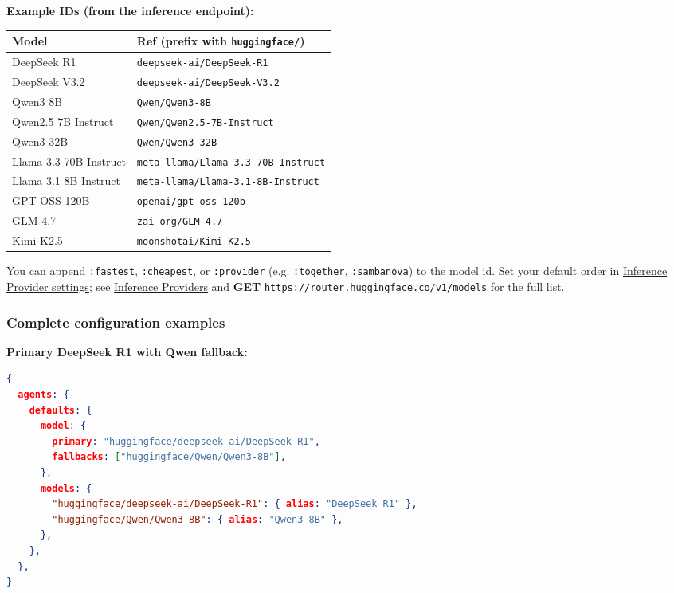 \textbf{Example IDs (from the inference endpoint):}


\begin{table}[h]
\centering
\small
\begin{tabular}{|l|l|}
\hline
Model & Ref (prefix with \texttt{huggingface/}) \\
\hline
DeepSeek R1 & \texttt{deepseek-ai/DeepSeek-R1} \\
\hline
DeepSeek V3.2 & \texttt{deepseek-ai/DeepSeek-V3.2} \\
\hline
Qwen3 8B & \texttt{Qwen/Qwen3-8B} \\
\hline
Qwen2.5 7B Instruct & \texttt{Qwen/Qwen2.5-7B-Instruct} \\
\hline
Qwen3 32B & \texttt{Qwen/Qwen3-32B} \\
\hline
Llama 3.3 70B Instruct & \texttt{meta-llama/Llama-3.3-70B-Instruct} \\
\hline
Llama 3.1 8B Instruct & \texttt{meta-llama/Llama-3.1-8B-Instruct} \\
\hline
GPT-OSS 120B & \texttt{openai/gpt-oss-120b} \\
\hline
GLM 4.7 & \texttt{zai-org/GLM-4.7} \\
\hline
Kimi K2.5 & \texttt{moonshotai/Kimi-K2.5} \\
\hline
\end{tabular}
\end{table}



You can append \texttt{:fastest}, \texttt{:cheapest}, or \texttt{:provider} (e.g. \texttt{:together}, \texttt{:sambanova}) to the model id. Set your default order in \href{https://hf.co/settings/inference-providers}{Inference Provider settings}; see \href{https://huggingface.co/docs/inference-providers}{Inference Providers} and \textbf{GET} \texttt{https://router.huggingface.co/v1/models} for the full list.

\subsubsection{Complete configuration examples}


\textbf{Primary DeepSeek R1 with Qwen fallback:}

\begin{lstlisting}[language=json]
{
  agents: {
    defaults: {
      model: {
        primary: "huggingface/deepseek-ai/DeepSeek-R1",
        fallbacks: ["huggingface/Qwen/Qwen3-8B"],
      },
      models: {
        "huggingface/deepseek-ai/DeepSeek-R1": { alias: "DeepSeek R1" },
        "huggingface/Qwen/Qwen3-8B": { alias: "Qwen3 8B" },
      },
    },
  },
}
\end{lstlisting}


